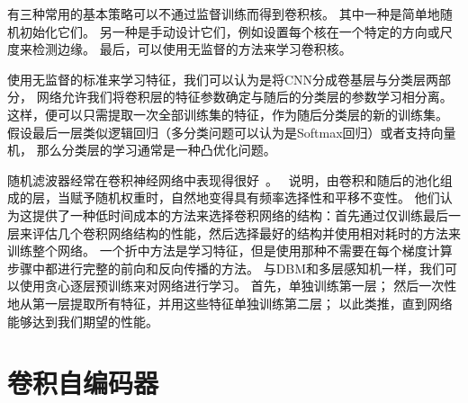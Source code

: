 有三种常用的基本策略可以不通过监督训练而得到卷积核。
其中一种是简单地随机初始化它们。
另一种是手动设计它们，例如设置每个核在一个特定的方向或尺度来检测边缘。
最后，可以使用无监督的方法来学习卷积核。\par

使用无监督的标准来学习特征，我们可以认为是将CNN分成卷基层与分类层两部分，
网络允许我们将卷积层的特征参数确定与随后的分类层的参数学习相分离。
这样，便可以只需提取一次全部训练集的特征，作为随后分类层的新的训练集。
假设最后一层类似逻辑回归（多分类问题可以认为是Softmax回归）或者支持向量机，
那么分类层的学习通常是一种凸优化问题。\par
随机滤波器经常在卷积神经网络中表现得很好~\cite{Jarrett-ICCV2009-small,Saxe-ICML2011,pinto2011scaling,cox2011beyond}。
\cite{Saxe-ICML2011}~说明，由卷积和随后的池化组成的层，当赋予随机权重时，自然地变得具有频率选择性和平移不变性。
他们认为这提供了一种低时间成本的方法来选择卷积网络的结构：首先通过仅训练最后一层来评估几个卷积网络结构的性能，然后选择最好的结构并使用相对耗时的方法来训练整个网络。
一个折中方法是学习特征，但是使用那种不需要在每个梯度计算步骤中都进行完整的前向和反向传播的方法。
与DBM和多层感知机一样，我们可以使用贪心逐层预训练来对网络进行学习。
首先，单独训练第一层；
然后一次性地从第一层提取所有特征，并用这些特征单独训练第二层；
以此类推，直到网络能够达到我们期望的性能。

\section{卷积自编码器}
